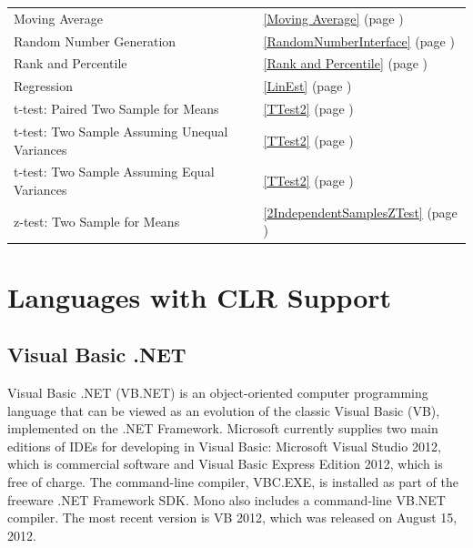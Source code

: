 \begin{center}
\begin{longtable}{l l}
		Moving Average &  \ref{Moving Average}  (page \pageref{Moving Average}) \index{Spreadsheet Procedures!Moving Average} \\
		Random Number Generation &  \ref{RandomNumberInterface}  (page \pageref{RandomNumberInterface}) \index{Spreadsheet Procedures!Random Number Generation} \\
		Rank and Percentile &  \ref{Rank and Percentile}  (page \pageref{Rank and Percentile}) \index{Spreadsheet Procedures!Rank and Percentile} \\
		Regression &  \ref{LinEst}  (page \pageref{LinEst}) \index{Spreadsheet Procedures!Regression} \\
		t-test: Paired Two Sample for Means &  \ref{TTest2}  (page \pageref{TTest2}) \index{Spreadsheet Procedures!t-test: Paired Two Sample for Means} \\
		t-test: Two Sample Assuming Unequal Variances &  \ref{TTest2}  (page \pageref{TTest2}) \index{Spreadsheet Procedures!t-test: Two Sample Assuming Unequal Variances} \\
		t-test: Two Sample Assuming Equal Variances &  \ref{TTest2}  (page \pageref{TTest2}) \index{Spreadsheet Procedures!t-test: Two Sample Assuming Equal Variances} \\
		z-test: Two Sample for Means &  \ref{2IndependentSamplesZTest}  (page \pageref{2IndependentSamplesZTest}) \index{Spreadsheet Procedures!z-test: Two Sample for Means} \\
	\end{longtable}
\end{center}








\chapter{Languages with CLR Support}
\label{Languages with CLR Support}

\section{Visual Basic .NET}

Visual Basic .NET (VB.NET) is an object-oriented computer programming language that can be viewed as an evolution of the classic Visual Basic (VB), implemented on the .NET Framework. Microsoft currently supplies two main editions of IDEs for developing in Visual Basic: Microsoft Visual Studio 2012, which is commercial software and Visual Basic Express Edition 2012, which is free of charge. The command-line compiler, VBC.EXE, is installed as part of the freeware .NET Framework SDK. Mono also includes a command-line VB.NET compiler. The most recent version is VB 2012, which was released on August 15, 2012.

